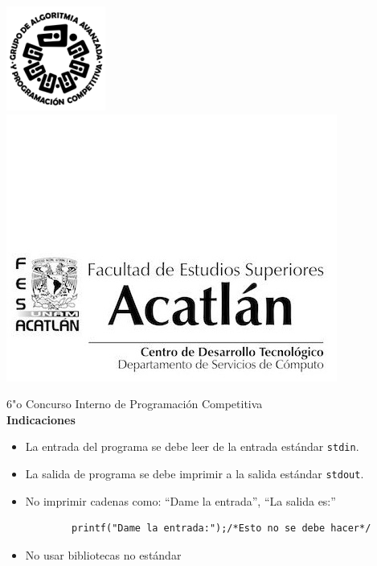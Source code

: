 \begin{titlepage}

\includegraphics[scale=0.6]{logo} \hspace*{9.00cm}
\includegraphics[scale=0.5]{dsc} 
\begin{center}
\LARGE{6"o Concurso Interno de Programación Competitiva}
$$$$
\Large{\bf{Indicaciones}}
\end{center}

\bigskip

\begin{itemize}

	\item La entrada del programa se debe leer de la entrada estándar \texttt{stdin}.
    
    \item La salida de programa se debe imprimir a la salida estándar \texttt{stdout}.
   	
    \item No imprimir cadenas como: ``Dame la entrada'', ``La salida es:''
    \begin{verbatim}
		printf("Dame la entrada:");/*Esto no se debe hacer*/
	\end{verbatim}
    
    \item No usar bibliotecas no estándar
  	

\end{itemize}
\end{titlepage}
